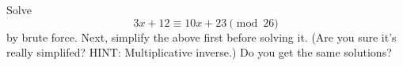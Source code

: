   Solve
  \[
    3x + 12 \equiv 10x + 23 \pmod{26}
  \]
  by brute force.
  Next, simplify the above first before solving it.
  (Are you sure it's really simplifed? HINT: Multiplicative inverse.)
  Do you get the same solutions?
